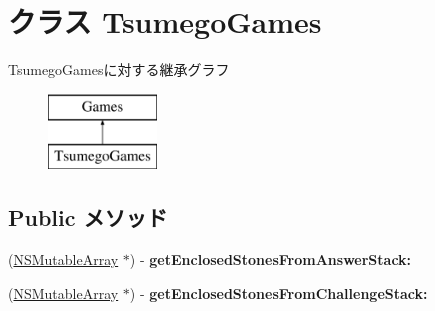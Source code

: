 \hypertarget{interface_tsumego_games}{
\section{クラス TsumegoGames}
\label{interface_tsumego_games}
}
TsumegoGamesに対する継承グラフ\begin{figure}[H]
\begin{center}
\leavevmode
\includegraphics[height=2.000000cm]{interface_tsumego_games}
\end{center}
\end{figure}
\subsection*{Public メソッド}
\begin{DoxyCompactItemize}
\item 
\hypertarget{interface_tsumego_games_a1214302231045c2a8d9325db7ab69083}{
(\hyperlink{class_n_s_mutable_array}{NSMutableArray} $\ast$) -\/ {\bfseries getEnclosedStonesFromAnswerStack:}}
\label{interface_tsumego_games_a1214302231045c2a8d9325db7ab69083}

\item 
\hypertarget{interface_tsumego_games_a1f08210c0c6886c19c1459d924f57c5c}{
(\hyperlink{class_n_s_mutable_array}{NSMutableArray} $\ast$) -\/ {\bfseries getEnclosedStonesFromChallengeStack:}}
\label{interface_tsumego_games_a1f08210c0c6886c19c1459d924f57c5c}

\end{DoxyCompactItemize}
